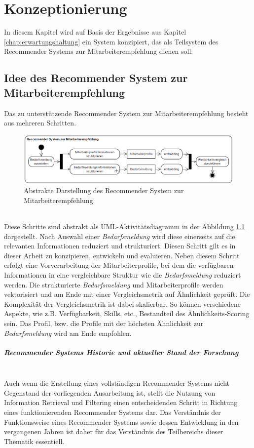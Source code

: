 \chapter{Konzeptionierung}
\label{chap:konzeption}
In diesem Kapitel wird auf Basis der Ergebnisse aus Kapitel \ref{chap:erwartungshaltung} ein System konzipiert, das als Teilsystem des Recommender Systems zur Mitarbeiterempfehlung dienen soll.
\section{Idee des Recommender System zur Mitarbeiterempfehlung}
Das zu unterstützende Recommender System zur Mitarbeiterempfehlung besteht aus mehreren Schritten.\\
\begin{figure}[H]
	\centering  
	\includegraphics[width=\linewidth]{Abbildungen/recommendersystem.png}
	\caption{Abstrakte Darstellung des Recommender System zur Mitarbeiterempfehlung.}
	\label{fig:recommendersystem}
\end{figure}\mbox{} \\
Diese Schritte sind abstrakt als UML-Aktivitätsdiagramm in der Abbildung \ref{fig:recommendersystem} dargestellt. Nach Auswahl einer \emph{Bedarfsmeldung} wird diese einerseits auf die relevanten Informationen reduziert und strukturiert. Diesen Schritt gilt es in dieser Arbeit zu konzipieren, entwickeln und evaluieren. Neben diesem Schritt erfolgt eine Vorverarbeitung der Mitarbeiterprofile, bei dem die verfügbaren Informationen in eine vergleichbare Struktur wie die \emph{Bedarfsmeldung} reduziert werden. Die strukturierte \emph{Bedarfsmeldung} und Mitarbeiterprofile werden vektorisiert und am Ende mit einer Vergleichsmetrik auf Ähnlichkeit geprüft. Die Komplexität der Vergleichsmetrik ist dabei skalierbar. So können verschiedene Aspekte, wie z.B. Verfügbarkeit, Skills, etc., Bestandteil des Ähnlichkeits-Scoring sein. Das Profil, bzw. die Profile mit der höchsten Ähnlichkeit zur \emph{Bedarfsmeldung} wird am Ende empfohlen.
\paragraph{Recommender Systems Historie und aktueller Stand der Forschung}\label{sec:rechistory}\mbox{} \\
Auch wenn die Erstellung eines vollständigen Recommender Systems nicht Gegenstand der vorliegenden Ausarbeitung ist, stellt die Nutzung von Information Retrieval und Filtering einen entscheidenden Schritt in Richtung eines funktionierenden Recommender Systems dar. Das Verständnis der Funktionsweise eines Recommender Systems sowie dessen Entwicklung in den vergangenen Jahren ist daher für das Verständnis des Teilbereichs dieser Thematik essentiell.\\

